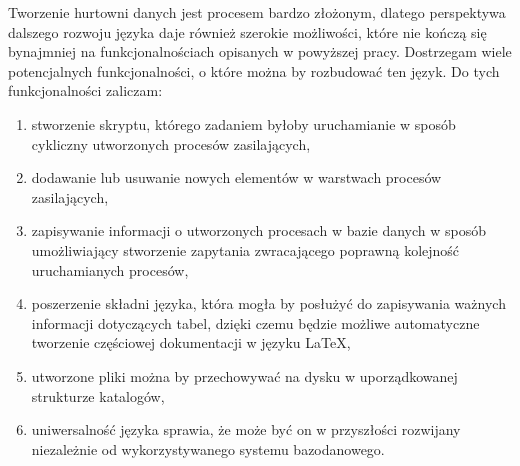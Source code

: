 Tworzenie hurtowni danych jest procesem bardzo złożonym, dlatego perspektywa dalszego rozwoju języka daje również szerokie możliwości,
które nie kończą się bynajmniej na funkcjonalnościach opisanych w powyższej pracy.
Dostrzegam wiele potencjalnych funkcjonalności, o które można by rozbudować ten język. Do tych funkcjonalności zaliczam:

\begin{enumerate}
  \item stworzenie skryptu, którego zadaniem byłoby uruchamianie w sposób cykliczny utworzonych procesów zasilających,
  \item dodawanie lub usuwanie nowych elementów w warstwach procesów zasilających,
  \item zapisywanie informacji o utworzonych procesach w bazie danych w sposób umożliwiający 
        stworzenie zapytania zwracającego poprawną kolejność uruchamianych procesów,
  \item poszerzenie składni języka, która mogła by posłużyć do zapisywania
        ważnych informacji dotyczących tabel, dzięki czemu będzie możliwe automatyczne tworzenie częściowej dokumentacji w języku \LaTeX,
  \item utworzone pliki można by przechowywać na dysku w uporządkowanej strukturze katalogów,
  \item uniwersalność języka sprawia, że może być on w przyszłości rozwijany niezależnie od wykorzystywanego systemu bazodanowego.
\end{enumerate}
